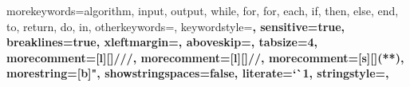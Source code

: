 

%
{
  morekeywords={algorithm, input, output, while, for, for, each, if, then, else, end, to, return, do, in},
  otherkeywords={},
  keywordstyle=\fontsize{10}{11}\bfseries,
  sensitive=true,
  breaklines=true,
  xleftmargin=\parindent,
  aboveskip=\bigskipamount,
  tabsize=4,
  morecomment=[l][\color{greencomments}]{///},
  morecomment=[l][\color{greencomments}]{//},
  morecomment=[s][\color{greencomments}]{{(*}{*)}},
  morestring=[b]",
  showstringspaces=false,
  literate={`}{\`}1,
  stringstyle=\color{redstrings},
}





\usepackage[acronym, toc, nopostdot, xindy, style=super]{glossaries}


\usepackage[squaren]{SIunits}


%
\usepackage{setspace}

%
\raggedbottom     %


\usepackage[%
   automark,	 %
   nouppercase,	 %
]{scrpage2}


